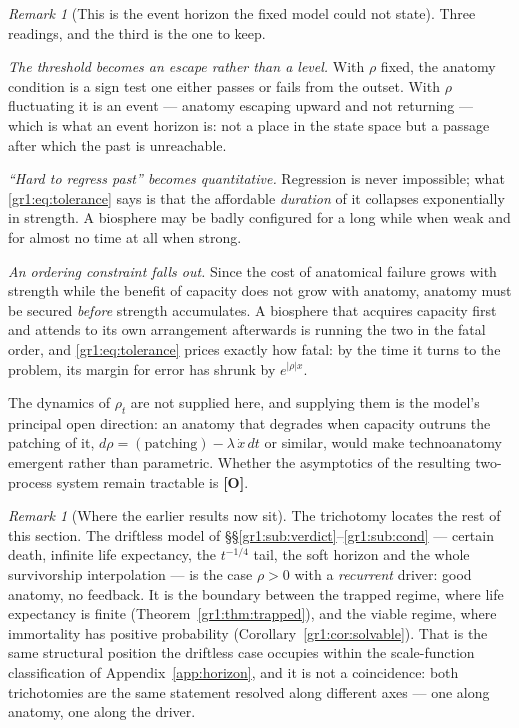 \documentclass[11pt]{article}
\numberwithin{equation}{section}
\theoremstyle{plain}
\theoremstyle{definition}
\theoremstyle{remark}
\newtheorem{remark}[theorem]{Remark}
\begin{document}
\begin{remark}[This is the event horizon the fixed model could not
state]\label{gr1:rem:horizonproper}
Three readings, and the third is the one to keep.

\emph{The threshold becomes an escape rather than a level.} With $\rho$
fixed, the anatomy condition is a sign test one either passes or fails
from the outset. With $\rho$ fluctuating it is an event --- anatomy
escaping upward and not returning --- which is what an event horizon
is: not a place in the state space but a passage after which the past
is unreachable.

\emph{``Hard to regress past'' becomes quantitative.} Regression is
never impossible; what \eqref{gr1:eq:tolerance} says is that the
affordable \emph{duration} of it collapses exponentially in strength. A
biosphere may be badly configured for a long while when weak and for
almost no time at all when strong.

\emph{An ordering constraint falls out.} Since the cost of anatomical
failure grows with strength while the benefit of capacity does not
grow with anatomy, anatomy must be secured \emph{before} strength
accumulates. A biosphere that acquires capacity first and attends to
its own arrangement afterwards is running the two in the fatal order,
and \eqref{gr1:eq:tolerance} prices exactly how fatal: by the time it
turns to the problem, its margin for error has shrunk by
$e^{|\rho|x}$.
\end{remark}

\noindent The dynamics of $\rho_t$ are not supplied here, and supplying
them is the model's principal open direction: an anatomy that degrades
when capacity outruns the patching of it, $d\rho=(\text{patching})-
\lambda\,\dot x\,dt$ or similar, would make technoanatomy emergent
rather than parametric. Whether the asymptotics of the resulting
two-process system remain tractable is \textbf{[O]}.

\begin{remark}[Where the earlier results now sit]\label{gr1:rem:wherenow}
The trichotomy locates the rest of this section. The driftless model of
\S\S\ref{gr1:sub:verdict}--\ref{gr1:sub:cond} --- certain death,
infinite life expectancy, the $t^{-1/4}$ tail, the soft horizon and the
whole survivorship interpolation --- is the case $\rho>0$ with a
\emph{recurrent} driver: good anatomy, no feedback. It is the boundary
between the trapped regime, where life expectancy is finite
(Theorem~\ref{gr1:thm:trapped}), and the viable regime, where
immortality has positive probability
(Corollary~\ref{gr1:cor:solvable}). That is the same structural position
the driftless case occupies within the scale-function classification of
Appendix~\ref{app:horizon}, and it is not a coincidence: both
trichotomies are the same statement resolved along different axes ---
one along anatomy, one along the driver.
\end{remark}
\end{document}
